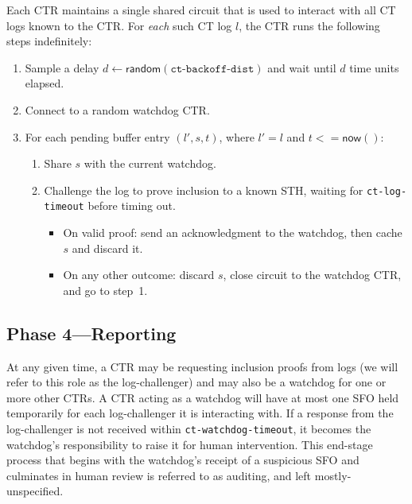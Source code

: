 Each CTR maintains a single shared circuit that is used to interact with all CT
logs known to the CTR. For \emph{each} such CT log $l$, the
CTR runs the following steps indefinitely:
\begin{enumerate}
    \item\label{enm:auditing:backoff} Sample a delay $d \gets
        \mathsf{random}(\texttt{ct-backoff-dist})$ and wait until $d$ time units
        elapsed.
    \item Connect to a random watchdog CTR.
    \item\label{enm:auditing:loop} For each pending buffer entry $(l',s,t)$,
    where $l' = l$ and $t <= \mathsf{now}()$:
		\begin{enumerate}
			\item\label{enm:ext:auditing:watchdog} Share $s$ with the current
				watchdog.
			\item\label{enm:ext:auditing:challenge} Challenge the log to prove
                                  inclusion to a known STH, waiting for \texttt{ct-log-timeout} before
                                  timing out.
				\begin{itemize}
					\item\label{enm:ext:auditing:challenge:success} On valid
						proof: send an acknowledgment to the watchdog, then
						cache $s$ and discard it.
					\item\label{enm:ext:auditing:challenge:fail} On any other
						outcome: discard $s$, close circuit to the watchdog CTR,
						and go to step~1.
				\end{itemize}
		\end{enumerate}
\end{enumerate}

\subsection{Phase 4---Reporting}

At any given time, a CTR may be requesting inclusion proofs from logs (we will refer to this role as the log-challenger) and may also be a watchdog for one or more other CTRs. A CTR acting as a watchdog will have at most one SFO held temporarily for each log-challenger it is interacting with. If a response from the log-challenger is not received within \texttt{ct-watchdog-timeout}, it becomes the watchdog's responsibility to raise it for human intervention. This end-stage process that begins with the watchdog's receipt of a suspicious SFO and culminates in human review is referred to as auditing, and left mostly-unspecified.

